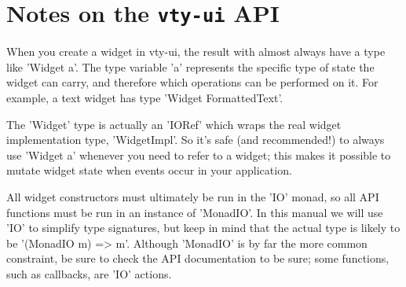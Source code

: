 \section{Notes on the \texttt{vty-ui} API}

When you create a widget in vty-ui, the result with almost always have a
type like 'Widget a'.  The type variable 'a' represents the specific
type of state the widget can carry, and therefore which operations can
be performed on it.  For example, a text widget has type 'Widget
FormattedText'.

The 'Widget' type is actually an 'IORef' which wraps the real widget
implementation type, 'WidgetImpl'.  So it's safe (and recommended!) to
always use 'Widget a' whenever you need to refer to a widget; this
makes it possible to mutate widget state when events occur in your
application.

All widget constructors must ultimately be run in the 'IO' monad, so
all API functions must be run in an instance of 'MonadIO'.  In this
manual we will use 'IO' to simplify type signatures, but keep in mind
that the actual type is likely to be '(MonadIO m) => m'.  Although
'MonadIO' is by far the more common constraint, be sure to check the
API documentation to be sure; some functions, such as callbacks, are
'IO' actions.

